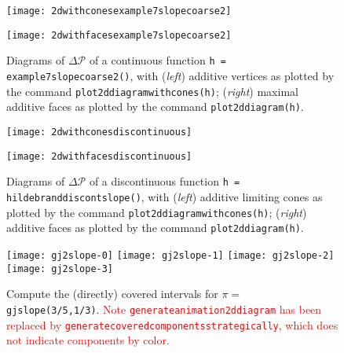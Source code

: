 \documentclass[10pt,reqno]{amsart}
\renewcommand{\P}{\mathcal{P}}
\def\Myunderscore{\textunderscore}%
\newcommand\underscore{\Myunderscore\allowbreak}
\let\_=\underscore
\DeclareRobustCommand\sage[1]{\texttt{#1}}
\begin{document}
  \begin{figure}[h]
    \centering
    \begin{minipage}{.49\textwidth}
      \centering
      \texttt{[image: 2d\_with\_cones\_example7slopecoarse2]}
    \end{minipage}
    \begin{minipage}{.49\textwidth}
      \centering
      \texttt{[image: 2d\_with\_faces\_example7slopecoarse2]}
    \end{minipage}
    \caption{Diagrams of $\Delta\P$ of a continuous function \sage{h
        = example7slopecoarse2()}, with (\textit{left}) additive vertices as
      plotted by the command \sage{plot\_2d\_diagram\_with\_cones(h)};
      (\textit{right}) maximal additive faces as plotted by the command
      \sage{plot\_2d\_diagram(h)}.}
    \label{fig:2d_diagrams_continuous_function}
  \end{figure}


\begin{figure}[h]
\centering
\begin{minipage}{.49\textwidth}
\centering
\texttt{[image: 2d\_with\_cones\_discontinuous]}
\end{minipage}
\begin{minipage}{.49\textwidth}
\centering
\texttt{[image: 2d\_with\_faces\_discontinuous]}
\end{minipage}
\caption{Diagrams of $\Delta\P$ of a discontinuous function \sage{h = hildebrand\underscore discont\underscore 3\underscore slope\underscore 1()}, with (\textit{left}) additive limiting cones as plotted by the command \sage{plot\_2d\_diagram\_with\_cones(h)}; (\textit{right}) additive faces as plotted by the command \sage{plot\_2d\_diagram(h)}.}
\label{fig:2d_diagrams_discontinuous_function}
\end{figure}


\begin{figure}[h]
\centering
\texttt{[image: gj2slope-0]}
\texttt{[image: gj2slope-1]}
\texttt{[image: gj2slope-2]}
\texttt{[image: gj2slope-3]}
\caption{Compute the (directly) covered intervals for \sage{$\pi =$
    gj\_2\_slope(3/5,1/3)}.
  \textcolor{red}{Note \sage{generate\_animation\_2d\_diagram} has been replaced by
    \sage{generate\_covered\_components\_strategically}, which does not
    indicate components by color.}
}
\label{fig:compute_covered_intervals_cont}
\end{figure}
\end{document}
